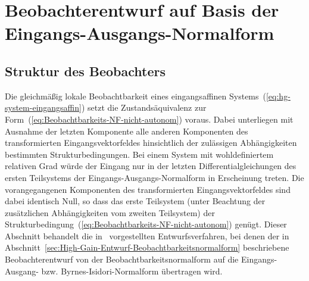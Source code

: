 \section{Beobachterentwurf auf Basis der Eingangs-Ausgangs-Normalform\label{sec:High-Gain-Entwurf-Eingangs-Ausgangs-Normalform}}

\subsection{Struktur des Beobachters}

Die gleichmäßig lokale Beobachtbarkeit eines eingangsaffinen Systems~(\ref{eq:hg-system-eingangsaffin})
setzt die Zustandsäquivalenz zur Form~(\ref{eq:Beobachtbarkeits-NF-nicht-autonom})
voraus. Dabei unterliegen mit Ausnahme der letzten Komponente alle
anderen Komponenten des transformierten Eingangsvektorfeldes hinsichtlich
der zulässigen Abhängigkeiten bestimmten Strukturbedingungen. Bei
einem System mit wohldefiniertem relativen Grad würde der Eingang
nur in der letzten Differentialgleichungen des ersten Teilsystems
der Eingangs-Ausgangs-Normalform in Erscheinung treten. Die vorangegangenen
Komponenten des transformierten Eingangsvektorfeldes sind dabei identisch
Null, so dass das erste Teilsystem (unter Beachtung der zusätzlichen
Abhängigkeiten vom zweiten Teilsystem) der Strukturbedingung~(\ref{eq:Beobachtbarkeits-NF-nicht-autonom})
genügt. Dieser Abschnitt behandelt die in~\cite{jo2000b,roebenack2004at,roebenack2007ndst}
vorgestellten Entwurfsverfahren, bei denen der in Abschnitt~\ref{sec:High-Gain-Entwurf-Beobachtbarkeitsnormalform}
beschriebene Beobachterentwurf von der Beobachtbarkeitsnormalform
auf die Eingangs-Ausgang- bzw. Byrnes-Isidori-Normalform übertragen
wird.

